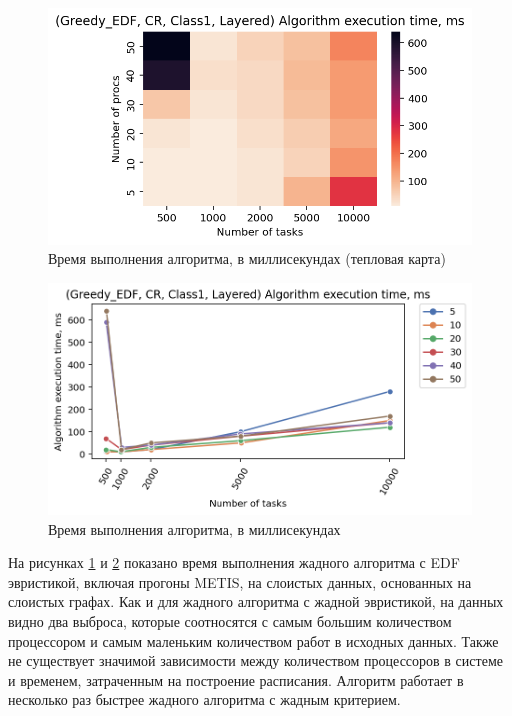 \begin{figure}[!htbp]
    \centering
    \includegraphics[width=\textwidth]{imgs/layered_class_1/CR_EDF/et_heatmap.png}
    \caption{Время выполнения алгоритма, в миллисекундах (тепловая карта)}
    \label{fig:CR-layered-EDF-exec-time-heatmap}
\end{figure}

\begin{figure}[!htbp]
    \centering
    \includegraphics[width=\textwidth]{imgs/layered_class_1/CR_EDF/tr_graph.png}
    \caption{Время выполнения алгоритма, в миллисекундах}
    \label{fig:CR-layered-EDF-exec-time-compiled}
\end{figure}

На рисунках \ref{fig:CR-layered-EDF-exec-time-heatmap} и \ref{fig:CR-layered-EDF-exec-time-compiled} показано время выполнения жадного алгоритма с EDF эвристикой, включая прогоны METIS, на слоистых данных, основанных на слоистых графах. Как и для жадного алгоритма с жадной эвристикой, на данных видно два выброса, которые соотносятся с самым большим количеством процессором и самым маленьким количеством работ в исходных данных. Также не существует значимой зависимости между количеством процессоров в системе и временем, затраченным на построение расписания. Алгоритм работает в несколько раз быстрее жадного алгоритма с жадным критерием.

